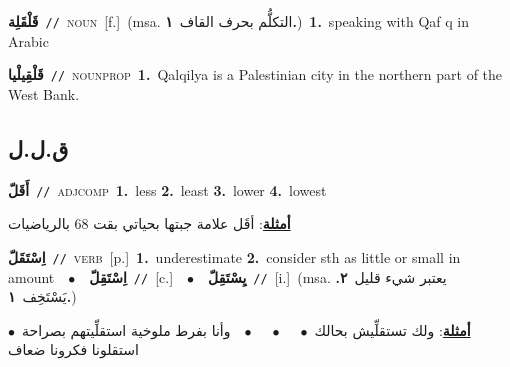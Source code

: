 \documentclass[10pt,a4paper,twoside]{article} %
\begin{document}
\begin{multicols}{2}
{\setlength\topsep{0pt}\textbf{\foreignlanguage{arabic}{قَلْقَلِة}}\ {\color{gray}\texttt{//}\color{black}}\ \textsc{noun}\ [f.]\ \color{gray}(msa. \foreignlanguage{arabic}{التكلُّم بحرف القاف}~\foreignlanguage{arabic}{\textbf{١.}})\color{black}\ \textbf{1.}~speaking with Qaf q in  Arabic\ } \vspace{2mm}

{\setlength\topsep{0pt}\textbf{\foreignlanguage{arabic}{قَلْقِيلْيا}}\ {\color{gray}\texttt{//}\color{black}}\ \textsc{noun\textunderscore prop}\ \textbf{1.}~Qalqilya is a Palestinian city in the northern part of the West Bank.\ } \vspace{2mm}

\vspace{-3mm}
\subsection*{\color{blue}\foreignlanguage{arabic}{ق.ل.ل}\color{blue}{}} 

{\setlength\topsep{0pt}\textbf{\foreignlanguage{arabic}{أَقَلّ}}\ {\color{gray}\texttt{//}\color{black}}\ \textsc{adj\textunderscore comp}\ \textbf{1.}~less  \textbf{2.}~least  \textbf{3.}~lower  \textbf{4.}~lowest\  \begin{flushright}\color{gray}\foreignlanguage{arabic}{\textbf{\underline{\foreignlanguage{arabic}{أمثلة}}}: أقَل علامة جبتها بحياتي بقت 68 بالرياضيات}\end{flushright}\color{black}} \vspace{2mm}

{\setlength\topsep{0pt}\textbf{\foreignlanguage{arabic}{اِسْتَقَلّ}}\ {\color{gray}\texttt{//}\color{black}}\ \textsc{verb}\ [p.]\ \textbf{1.}~underestimate  \textbf{2.}~consider sth as little or small in amount\ \ $\bullet$\ \ \setlength\topsep{0pt}\textbf{\foreignlanguage{arabic}{اِسْتَقِلّ}}\ {\color{gray}\texttt{//}\color{black}}\ [c.]\ \ $\bullet$\ \ \setlength\topsep{0pt}\textbf{\foreignlanguage{arabic}{يِسْتَقِلّ}}\ {\color{gray}\texttt{//}\color{black}}\ [i.]\ \color{gray}(msa. \foreignlanguage{arabic}{يعتبر شيء قليل}~\foreignlanguage{arabic}{\textbf{٢.}}  \foreignlanguage{arabic}{يَسْتَخِف}~\foreignlanguage{arabic}{\textbf{١.}})\color{black}\  \begin{flushright}\color{gray}\foreignlanguage{arabic}{\textbf{\underline{\foreignlanguage{arabic}{أمثلة}}}: ولك تستقلِّيش بحالك\ $\bullet$\ \  \ $\bullet$\ \  \ $\bullet$\ \  وأنا بفرط ملوخية استقلِّيتهم بصراحة\ $\bullet$\ \  استقلونا فكرونا ضعاف}\end{flushright}\color{black}} \vspace{2mm}


\end{multicols}
\end{document}
